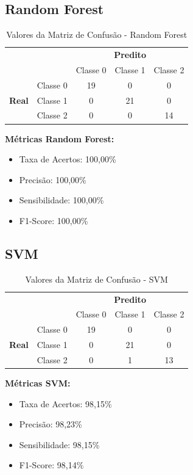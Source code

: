 \documentclass[12pt,a4paper]{article}
\begin{document}
\subsection{Random Forest}

\begin{table}[H]
\centering
\caption{Valores da Matriz de Confusão - Random Forest}
\begin{tabular}{cc|ccc}
\toprule
& & \multicolumn{3}{c}{\textbf{Predito}} \\
& & Classe 0 & Classe 1 & Classe 2 \\
\midrule
\multirow{3}{*}{\textbf{Real}} 
& Classe 0 & 19 & 0 & 0 \\
& Classe 1 & 0 & 21 & 0 \\
& Classe 2 & 0 & 0 & 14 \\
\bottomrule
\end{tabular}
\end{table}

\textbf{Métricas Random Forest:}
\begin{itemize}
    \item Taxa de Acertos: 100,00\%
    \item Precisão: 100,00\%
    \item Sensibilidade: 100,00\%
    \item F1-Score: 100,00\%
\end{itemize}

\subsection{SVM}

\begin{table}[H]
\centering
\caption{Valores da Matriz de Confusão - SVM}
\begin{tabular}{cc|ccc}
\toprule
& & \multicolumn{3}{c}{\textbf{Predito}} \\
& & Classe 0 & Classe 1 & Classe 2 \\
\midrule
\multirow{3}{*}{\textbf{Real}} 
& Classe 0 & 19 & 0 & 0 \\
& Classe 1 & 0 & 21 & 0 \\
& Classe 2 & 0 & 1 & 13 \\
\bottomrule
\end{tabular}
\end{table}

\textbf{Métricas SVM:}
\begin{itemize}
    \item Taxa de Acertos: 98,15\%
    \item Precisão: 98,23\%
    \item Sensibilidade: 98,15\%
    \item F1-Score: 98,14\%
\end{itemize}
\end{document}

